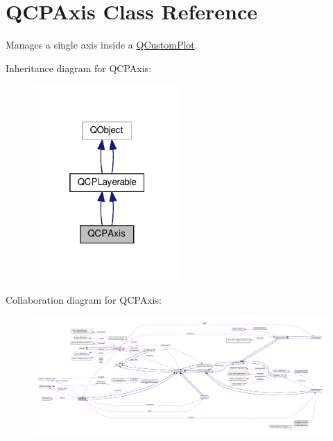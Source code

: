 \hypertarget{class_q_c_p_axis}{}\section{Q\+C\+P\+Axis Class Reference}
\label{class_q_c_p_axis}


Manages a single axis inside a \hyperlink{class_q_custom_plot}{Q\+Custom\+Plot}.  




Inheritance diagram for Q\+C\+P\+Axis\+:\nopagebreak
\begin{figure}[H]
\begin{center}
\leavevmode
\includegraphics[width=160pt]{class_q_c_p_axis__inherit__graph}
\end{center}
\end{figure}


Collaboration diagram for Q\+C\+P\+Axis\+:\nopagebreak
\begin{figure}[H]
\begin{center}
\leavevmode
\includegraphics[width=350pt]{class_q_c_p_axis__coll__graph}
\end{center}
\end{figure}
